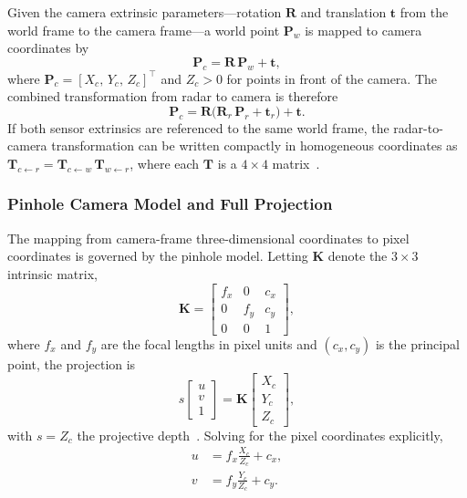 Given the camera extrinsic parameters---rotation $\mathbf{R}$ and translation $\mathbf{t}$ from the world frame to the camera frame---a world point $\mathbf{P}_w$ is mapped to camera coordinates by
\begin{equation}\label{eq:world2cam}
  \mathbf{P}_c = \mathbf{R}\,\mathbf{P}_w + \mathbf{t},
\end{equation}
where $\mathbf{P}_c = [X_c,\, Y_c,\, Z_c]^\top$ and $Z_c > 0$ for points in front of the camera. The combined transformation from radar to camera is therefore
\begin{equation}\label{eq:radar2cam}
  \mathbf{P}_c = \mathbf{R}\bigl(\mathbf{R}_r\,\mathbf{P}_r + \mathbf{t}_r\bigr) + \mathbf{t}.
\end{equation}
If both sensor extrinsics are referenced to the same world frame, the radar-to-camera transformation can be written compactly in homogeneous coordinates as $\mathbf{T}_{c\leftarrow r} = \mathbf{T}_{c\leftarrow w}\,\mathbf{T}_{w\leftarrow r}$, where each $\mathbf{T}$ is a $4\times 4$ matrix~\cite{zhang2000flexible}.

\subsubsection{Pinhole Camera Model and Full Projection}

The mapping from camera-frame three-dimensional coordinates to pixel coordinates is governed by the pinhole model. Letting $\mathbf{K}$ denote the $3\times 3$ intrinsic matrix,
\begin{equation}\label{eq:intrinsic_matrix}
  \mathbf{K} = \begin{bmatrix}
    f_x & 0   & c_x \\
    0   & f_y & c_y \\
    0   & 0   & 1
  \end{bmatrix},
\end{equation}
where $f_x$ and $f_y$ are the focal lengths in pixel units and $(c_x, c_y)$ is the principal point, the projection is
\begin{equation}\label{eq:pinhole}
  s \begin{bmatrix} u \\ v \\ 1 \end{bmatrix}
  = \mathbf{K} \begin{bmatrix} X_c \\ Y_c \\ Z_c \end{bmatrix},
\end{equation}
with $s = Z_c$ the projective depth~\cite{zhang2000flexible}. Solving for the pixel coordinates explicitly,
\begin{align}
  u &= f_x \frac{X_c}{Z_c} + c_x, \label{eq:pixel_u}\\
  v &= f_y \frac{Y_c}{Z_c} + c_y. \label{eq:pixel_v}
\end{align}

